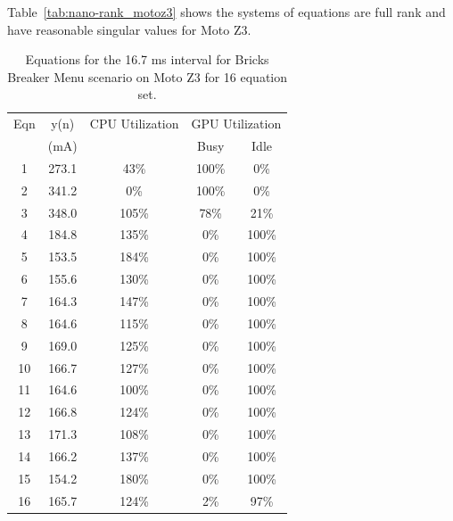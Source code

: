 Table~\ref{tab:nano-rank_motoz3} shows the systems of equations are full rank and have reasonable singular values for Moto Z3. 
%

\begin{table}[tp]
    \centering
    \caption{Equations for the 16.7 ms interval for Bricks Breaker Menu scenario on Moto Z3 for 16 equation set.}
    {\small
    \begin{tabular}{|c|c|c|c|c|}
        \hline
            Eqn & y(n) & \multicolumn{1}{c|}{CPU Utilization} & \multicolumn{2}{c|}{GPU Utilization} \\
        \cline{4-5}
            & (mA) & \multicolumn{1}{c|}{} & Busy & Idle \\
        \hline
                 1 & 273.1 &  43\% &  100\% &    0\% \\
                 2 & 341.2 &   0\% &  100\% &    0\% \\
                 3 & 348.0 & 105\% &   78\% &   21\% \\
                 4 & 184.8 & 135\% &    0\% &  100\% \\
                 5 & 153.5 & 184\% &    0\% &  100\% \\
                 6 & 155.6 & 130\% &    0\% &  100\% \\
                 7 & 164.3 & 147\% &    0\% &  100\% \\
                 8 & 164.6 & 115\% &    0\% &  100\% \\
                 9 & 169.0 & 125\% &    0\% &  100\% \\
                10 & 166.7 & 127\% &    0\% &  100\% \\
                11 & 164.6 & 100\% &    0\% &  100\% \\
                12 & 166.8 & 124\% &    0\% &  100\% \\
                13 & 171.3 & 108\% &    0\% &  100\% \\
                14 & 166.2 & 137\% &    0\% &  100\% \\
                15 & 154.2 & 180\% &    0\% &  100\% \\
                16 & 165.7 & 124\% &    2\% &   97\% \\
        \hline
    \end{tabular}
    }
    \label{tab:equations_nano}
\end{table}

